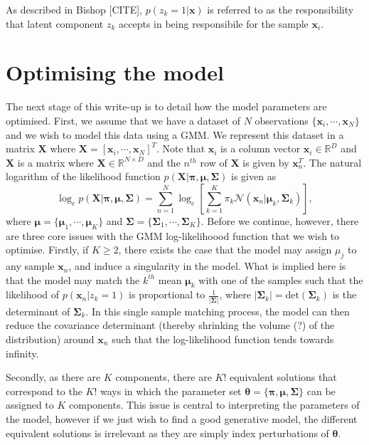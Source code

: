 \documentclass{article}
\begin{document}
As described in Bishop [CITE], $p(z_k = 1\vert \mathbf{x})$ is referred to as the responsibility that latent component $z_k$ accepts in being responsibile for the sample $\mathbf{x}_i$.

\section{Optimising the model}
The next stage of this write-up is to detail how the model parameters are optimised. First, we assume that we have a dataset of $N$ observations $\{\mathbf{x}_i, \cdots, \mathbf{x}_N\}$ and we wish to model this data using a GMM. We represent this dataset in a matrix $\mathbf{X}$ where $\mathbf{X} = \left[ \mathbf{x}_i, \cdots, \mathbf{x}_N \right]^T$. Note that $\mathbf{x}_i$ is a column vector $\mathbf{x}_i \in \mathbb{R}^D$ and $\mathbf{X}$ is a matrix where $\mathbf{X} \in \mathbb{R}^{N \times D}$ and the $n^{th}$ row of $\mathbf{X}$ is given by $\mathbf{x}_n^T$.  The natural logarithm of the likelihood function $p(\mathbf{X}\vert \boldsymbol\pi, \boldsymbol\mu, \boldsymbol\Sigma)$ is given as
\begin{equation}\label{eq:ll_function}
\log_e p(\mathbf{X}\vert \boldsymbol\pi, \boldsymbol\mu, \boldsymbol\Sigma) = \sum_{n = 1}^{N} \log_e \left[  \sum_{k=1}^{K} \pi_k \mathcal{N}(\mathbf{x}_n \vert \boldsymbol\mu_k, \boldsymbol\Sigma_k) \right],
\end{equation}
where $\boldsymbol\mu = \{ \boldsymbol\mu_1, \cdots, \boldsymbol\mu_K \}$ and $\boldsymbol\Sigma = \{ \boldsymbol\Sigma_1, \cdots, \boldsymbol\Sigma_K \}$. Before we continue, however, there are three core issues with the GMM log-likelihoood function that we wish to optimise. Firstly, if $K \geq 2$, there exists the case that the model may assign $\mu_j$ to any sample $\mathbf{x}_n$, and induce a singularity in the model. What is implied here is that the model may match the $k^{th}$ mean $\boldsymbol\mu_k$ with one of the samples such that the likelihood of $p(\mathbf{x}_n\vert z_k = 1)$ is proportional to $\frac{1}{\vert \boldsymbol\Sigma \vert}$, where $\vert \boldsymbol\Sigma_k \vert = \text{det}(\boldsymbol\Sigma_k)$ is the determinant of $\boldsymbol\Sigma_k$. In this single sample matching process, the model can then reduce the covariance determinant (thereby shrinking the volume (?) of the distribution) around $\mathbf{x}_n$ such that the log-likelihood function tends towards infinity. 

Secondly, as there are $K$ components, there are $K!$ equivalent solutions that correspond to the $K!$ ways in which the parameter set $\boldsymbol\theta = \{\boldsymbol\pi, \boldsymbol\mu, \boldsymbol\Sigma \}$ can be assigned to $K$ components. This issue is central to interpreting the parameters of the model, however if we just wish to find a good generative model, the different equivalent solutions is irrelevant as they are simply index perturbations of $\boldsymbol\theta$.
\end{document}
